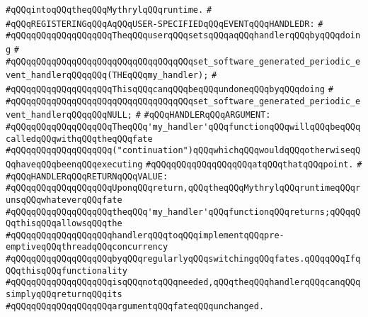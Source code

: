 \verb|#qQQqintoqQQqtheqQQqMythrylqQQqruntime.|\newline
\verb|#|\newline
\verb|#qQQqREGISTERINGqQQqAqQQqUSER-SPECIFIEDqQQqEVENTqQQqHANDLEDR:|\newline
\verb|#|\newline
\verb|#qQQqqQQqqQQqqQQqqQQqTheqQQquserqQQqsetsqQQqaqQQqhandlerqQQqbyqQQqdoing|\newline
\verb|#|\newline
\verb|#qQQqqQQqqQQqqQQqqQQqqQQqqQQqqQQqqQQqset_software_generated_periodic_event_handlerqQQqqQQq(THEqQQqmy_handler);|\newline
\verb|#|\newline
\verb|#qQQqqQQqqQQqqQQqqQQqThisqQQqcanqQQqbeqQQqundoneqQQqbyqQQqdoing|\newline
\verb|#|\newline
\verb|#qQQqqQQqqQQqqQQqqQQqqQQqqQQqqQQqqQQqset_software_generated_periodic_event_handlerqQQqqQQqNULL;|\newline
\verb|#|\newline
\verb|#qQQqHANDLERqQQqARGUMENT:|\newline
\verb|#qQQqqQQqqQQqqQQqqQQqTheqQQq'my_handler'qQQqfunctionqQQqwillqQQqbeqQQqcalledqQQqwithqQQqtheqQQqfate|\newline
\verb|#qQQqqQQqqQQqqQQqqQQq("continuation")qQQqwhichqQQqwouldqQQqotherwiseqQQqhaveqQQqbeenqQQqexecuting|\newline
\verb|#qQQqqQQqqQQqqQQqqQQqatqQQqthatqQQqpoint.|\newline
\verb|#|\newline
\verb|#qQQqHANDLERqQQqRETURNqQQqVALUE:|\newline
\verb|#qQQqqQQqqQQqqQQqqQQqUponqQQqreturn,qQQqtheqQQqMythrylqQQqruntimeqQQqrunsqQQqwhateverqQQqfate|\newline
\verb|#qQQqqQQqqQQqqQQqqQQqtheqQQq'my_handler'qQQqfunctionqQQqreturns;qQQqqQQqthisqQQqallowsqQQqthe|\newline
\verb|#qQQqqQQqqQQqqQQqqQQqhandlerqQQqtoqQQqimplementqQQqpre-emptiveqQQqthreadqQQqconcurrency|\newline
\verb|#qQQqqQQqqQQqqQQqqQQqbyqQQqregularlyqQQqswitchingqQQqfates.qQQqqQQqIfqQQqthisqQQqfunctionality|\newline
\verb|#qQQqqQQqqQQqqQQqqQQqisqQQqnotqQQqneeded,qQQqtheqQQqhandlerqQQqcanqQQqsimplyqQQqreturnqQQqits|\newline
\verb|#qQQqqQQqqQQqqQQqqQQqargumentqQQqfateqQQqunchanged.|\newline
\newline

